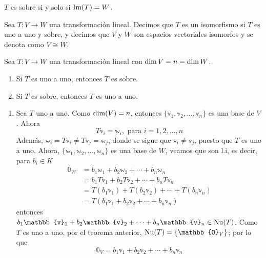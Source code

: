 \newpage

\begin{observation}
    $T$ es sobre si y solo si $\operatorname{Im}(T) = W$.
\end{observation}

\begin{definition}
    Sea $T:V \longrightarrow W$ una transformación lineal. Decimos que $T$ es un isomorfismo si $T$ es uno a uno y sobre, y decimos que $V$ y $W$ son espacios vectoriales isomorfos y se denota como $V \cong W$.
\end{definition}

\begin{theorem}\label{theo:unoauno-sobre}
    Sea $T:V \longrightarrow W$ una transformación lineal con $\operatorname{dim} V = n = \operatorname{dim} W$.
    \begin{enumerate}[label=\roman*)]
        \item Si $T$ es uno a uno, entonces $T$ es sobre.
        \item Si $T$ es sobre, entonces $T$ es uno a uno.
    \end{enumerate}
    \demostracion
    \begin{enumerate}[label=\roman*)]
        \item Sea $T$ uno a uno. Como $\operatorname{dim}(V) = n$, entonces $\{ \mathbb{v}_1,  \mathbb{v}_2,  \dots,  \mathbb{v}_n \}$ es una base de $V$. Ahora
        $$T\mathbb{v}_i = \mathbb{w}_i, \text{ para } i = 1, 2, \dots, n$$
        Además, $\mathbb{w}_i = T\mathbb{v}_i \neq T\mathbb{v}_j = \mathbb{w}_j$, donde se sigue que $\mathbb{v}_i \neq \mathbb{v}_j$, puesto que $T$ es uno a uno. Ahora, $\{ \mathbb{w}_1, \mathbb{w}_2, \dots,  \mathbb{w}_n \}$ es una base de $W$, veamos que son l.i, es decir, para $b_i \in K$
        \begin{align*}
            \mathbb{0}_W & = b_1\mathbb{w}_1 + b_2\mathbb{w}_2 + \cdots + b_n \mathbb{w}_n \\
            & = b_1T\mathbb{v}_1 + b_2T\mathbb{v}_2 + \cdots + b_nT\mathbb{v}_n \\
            & = T(b_1\mathbb{v}_1) + T(b_2\mathbb{v}_2) + \cdots + T(b_n\mathbb{v}_n) \\
            & = T(b_1\mathbb{v}_1 + b_2\mathbb{v}_2 + \cdots + b_n\mathbb{v}_n)
        \end{align*}
        entonces $b_1\mathbb{v}_1 + b_2\mathbb{v}_2 + \cdots + b_n\mathbb{v}_n \in \Nuc(T)$. Como $T$ es uno a uno, por el teorema anterior, $\Nuc(T) = \{ \mathbb{0}_V \}$; por lo que
        $$\mathbb{0}_V = b_1\mathbb{v}_1 + b_2\mathbb{v}_2 + \cdots + b_n\mathbb{v}_n$$

\end{enumerate}
\end{theorem}
